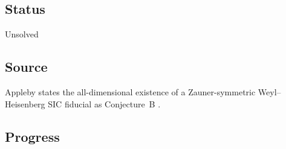 \subsection*{Status}

Unsolved

\subsection*{Source}

Appleby states the all-dimensional existence of a Zauner-symmetric
Weyl--Heisenberg SIC fiducial as Conjecture~B
.

\subsection*{Progress}

